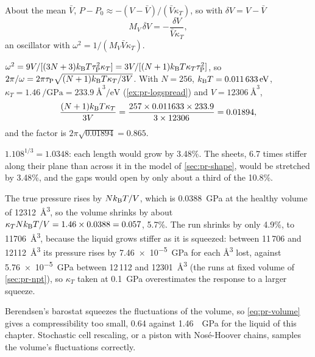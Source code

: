 About the mean $\bar V$, $P - P_0 \approx
-(V - \bar V)/(\bar V\kappa_T)$, so with $\delta V = V - \bar V$
\begin{equation*}
   M_V\,\ddot{\delta V} = -\frac{\delta V}{\bar V\kappa_T} ,
\end{equation*}
an oscillator with $\omega^2 = 1/(M_V\bar V\kappa_T)$.

$\omega^2 = 9V/[(3N + 3)k_{\mathrm{B}} T\tau_{\mathrm P}^2
\kappa_T] = 3V/[(N + 1)k_{\mathrm{B}} T\kappa_T\tau_{\mathrm P}^2]$, so $2\pi/\omega =
2\pi\tau_{\mathrm P}\sqrt{(N + 1)k_{\mathrm{B}} T\kappa_T/3V}$. With $N = 256$, $k_{\mathrm{B}} T
= \SI{0.011633}{\electronvolt}$, $\kappa_T = \SI{1.46}{\per\giga\pascal}
= \SI{233.9}{\angstrom\cubed\per\electronvolt}$ (\cref{ex:pr-logspread})
and $V = \SI{12306}{\angstrom\cubed}$,
\begin{equation*}
   \frac{(N + 1)k_{\mathrm{B}} T\kappa_T}{3V}
   = \frac{257\times0.011633\times233.9}{3\times12306} = 0.01894 ,
\end{equation*}
and the factor is $2\pi\sqrt{0.01894} = 0.865$.

$1.108^{1/3} = 1.0348$: each length would grow
by 3.48\%. The sheets, 6.7 times stiffer along their plane than across it
in the model of \cref{sec:pr-shape}, would be stretched by 3.48\%, and the
gaps would open by only about a third of the 10.8\%.

The true pressure rises by $Nk_{\mathrm{B}} T/V$, which
is \SI{0.0388}{\giga\pascal} at the healthy volume of
\SI{12312}{\angstrom\cubed}, so the volume shrinks by about $\kappa_TNk_{\mathrm{B}}
T/V = 1.46\times0.0388 = 0.057$, 5.7\%. The run shrinks by only 4.9\%,
to \SI{11706}{\angstrom\cubed}, because the liquid grows stiffer as it is
squeezed: between 11\,706 and \SI{12112}{\angstrom\cubed} its pressure
rises by \SI{7.46e-5}{\giga\pascal} for each \si{\angstrom\cubed} lost,
against \SI{5.76e-5}{\giga\pascal} between 12\,112 and
\SI{12301}{\angstrom\cubed} (the runs at fixed volume of
\cref{sec:pr-npt}), so $\kappa_T$ taken at \SI{0.1}{\giga\pascal}
overestimates the response to a larger squeeze.

Berendsen's barostat squeezes the fluctuations
of the volume, so \cref{eq:pr-volume} gives a compressibility too small,
0.64 against \SI{1.46}{\per\giga\pascal} for the liquid of this chapter.
Stochastic cell rescaling, or a piston with Nosé-Hoover chains, samples the
volume's fluctuations correctly.
